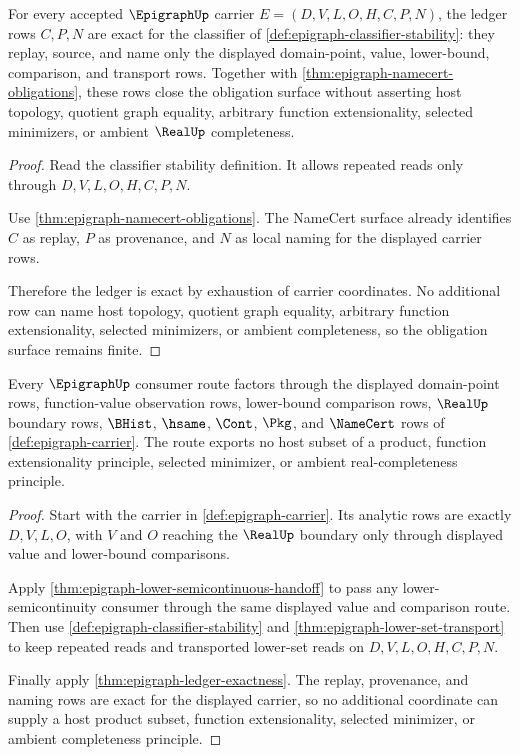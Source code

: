 \begin{theorem}
\label{thm:epigraph-ledger-exactness}
For every accepted $\EpigraphUp$ carrier $E=(D,V,L,O,H,C,P,N)$, the ledger rows $C,P,N$ are exact for the classifier of \autoref{def:epigraph-classifier-stability}: they replay, source, and name only the displayed domain-point, value, lower-bound, comparison, and transport rows. Together with \autoref{thm:epigraph-namecert-obligations}, these rows close the obligation surface without asserting host topology, quotient graph equality, arbitrary function extensionality, selected minimizers, or ambient $\RealUp$ completeness.
\end{theorem}
\begin{proof}
Read the classifier stability definition. It allows repeated reads only through $D,V,L,O,H,C,P,N$.

Use \autoref{thm:epigraph-namecert-obligations}. The NameCert surface already identifies $C$ as replay, $P$ as provenance, and $N$ as local naming for the displayed carrier rows.

Therefore the ledger is exact by exhaustion of carrier coordinates. No additional row can name host topology, quotient graph equality, arbitrary function extensionality, selected minimizers, or ambient completeness, so the obligation surface remains finite.
\end{proof}

\begin{theorem}
\label{thm:epigraph-scoped-kernel-dependencies}
Every $\EpigraphUp$ consumer route factors through the displayed domain-point rows, function-value observation rows, lower-bound comparison rows, $\RealUp$ boundary rows, $\BHist$, $\hsame$, $\Cont$, $\Pkg$, and $\NameCert$ rows of \autoref{def:epigraph-carrier}. The route exports no host subset of a product, function extensionality principle, selected minimizer, or ambient real-completeness principle.
\end{theorem}
\begin{proof}
Start with the carrier in \autoref{def:epigraph-carrier}. Its analytic rows are exactly $D,V,L,O$, with $V$ and $O$ reaching the $\RealUp$ boundary only through displayed value and lower-bound comparisons.

Apply \autoref{thm:epigraph-lower-semicontinuous-handoff} to pass any lower-semicontinuity consumer through the same displayed value and comparison route. Then use \autoref{def:epigraph-classifier-stability} and \autoref{thm:epigraph-lower-set-transport} to keep repeated reads and transported lower-set reads on $D,V,L,O,H,C,P,N$.

Finally apply \autoref{thm:epigraph-ledger-exactness}. The replay, provenance, and naming rows are exact for the displayed carrier, so no additional coordinate can supply a host product subset, function extensionality, selected minimizer, or ambient completeness principle.
\end{proof}

